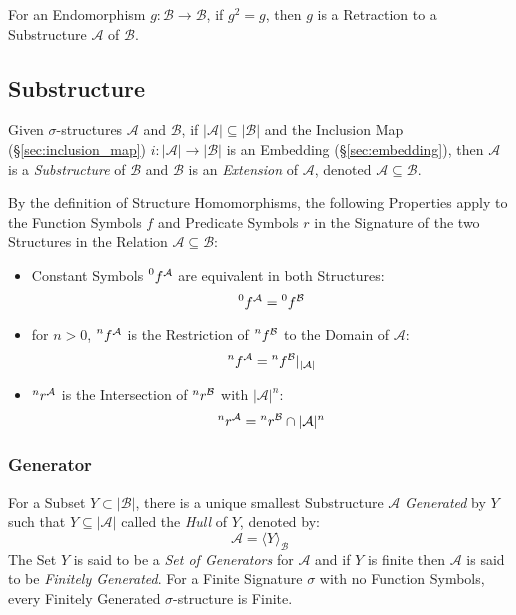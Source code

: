 For an Endomorphism $g : \mathcal{B} \rightarrow \mathcal{B}$, if $g^2
= g$, then $g$ is a Retraction to a Substructure $\mathcal{A}$ of
$\mathcal{B}$.



\subsection{Substructure}\label{sec:substructure}

Given $\sigma$-structures $\mathcal{A}$ and $\mathcal{B}$, if
$|\mathcal{A}| \subseteq |\mathcal{B}|$ and the Inclusion Map
(\S\ref{sec:inclusion_map}) $i : |\mathcal{A}| \rightarrow
|\mathcal{B}|$ is an Embedding (\S\ref{sec:embedding}), then
$\mathcal{A}$ is a \emph{Substructure} of $\mathcal{B}$ and
$\mathcal{B}$ is an \emph{Extension} of $\mathcal{A}$, denoted
$\mathcal{A} \subseteq \mathcal{B}$.

By the definition of Structure Homomorphisms, the following Properties
apply to the Function Symbols $f$ and Predicate Symbols $r$ in the
Signature of the two Structures in the Relation $\mathcal{A} \subseteq
\mathcal{B}$:
\begin{itemize}
    \item Constant Symbols $\prescript{0}{}{f}^\mathcal{A}$ are
      equivalent in both Structures:
\[
    \prescript{0}{}{f}^\mathcal{A} = \prescript{0}{}{f}^\mathcal{B}
\]
    \item for $n >0$, $\prescript{n}{}{f}^\mathcal{A}$ is the
      Restriction of $\prescript{n}{}{f}^\mathcal{B}$ to the Domain of
      $\mathcal{A}$:
\[
    \prescript{n}{}{f}^\mathcal{A}
    = \prescript{n}{}{f}^\mathcal{B} |_{|\mathcal{A}|}
\]
    \item $\prescript{n}{}{r}^\mathcal{A}$ is the Intersection of
      $\prescript{n}{}{r}^\mathcal{B}$ with $|\mathcal{A}|^n$:
\[
    \prescript{n}{}{r}^\mathcal{A}
    = \prescript{n}{}{r}^\mathcal{B} \cap |\mathcal{A}|^n
\]
\end{itemize}



\subsubsection{Generator} \label{sec:generator}

For a Subset $Y \subset |\mathcal{B}|$, there is a unique smallest
Substructure $\mathcal{A}$ \emph{Generated} by $Y$ such that $Y
\subseteq |\mathcal{A}|$ called the \emph{Hull} of $Y$, denoted by:
\[
    \mathcal{A} = \langle Y \rangle_\mathcal{B}
\]
The Set $Y$ is said to be a \emph{Set of Generators} for $\mathcal{A}$
and if $Y$ is finite then $\mathcal{A}$ is said to be \emph{Finitely
  Generated}. For a Finite Signature $\sigma$ with no Function
Symbols, every Finitely Generated $\sigma$-structure is Finite.

